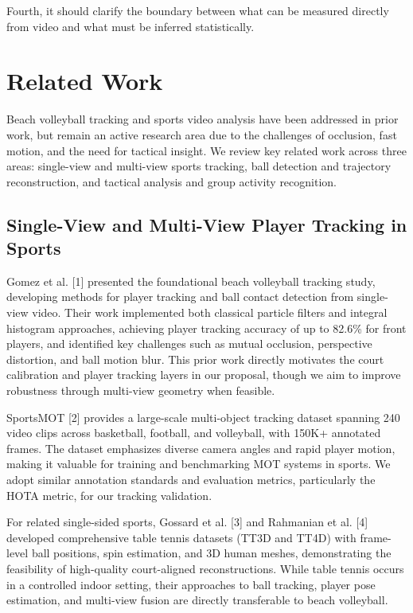 \documentclass[a4paper]{article}
\begin{document}
Fourth, it should clarify the boundary between what can be measured directly from video and what must be inferred statistically.

\section{Related Work}

Beach volleyball tracking and sports video analysis have been addressed in prior work, but remain an active research area due to the challenges of occlusion, fast motion, and the need for tactical insight. We review key related work across three areas: single-view and multi-view sports tracking, ball detection and trajectory reconstruction, and tactical analysis and group activity recognition.

\subsection{Single-View and Multi-View Player Tracking in Sports}

Gomez et al. [1] presented the foundational beach volleyball tracking study, developing methods for player tracking and ball contact detection from single-view video. Their work implemented both classical particle filters and integral histogram approaches, achieving player tracking accuracy of up to 82.6\% for front players, and identified key challenges such as mutual occlusion, perspective distortion, and ball motion blur. This prior work directly motivates the court calibration and player tracking layers in our proposal, though we aim to improve robustness through multi-view geometry when feasible.

SportsMOT [2] provides a large-scale multi-object tracking dataset spanning 240 video clips across basketball, football, and volleyball, with 150K+ annotated frames. The dataset emphasizes diverse camera angles and rapid player motion, making it valuable for training and benchmarking MOT systems in sports. We adopt similar annotation standards and evaluation metrics, particularly the HOTA metric, for our tracking validation.

For related single-sided sports, Gossard et al. [3] and Rahmanian et al. [4] developed comprehensive table tennis datasets (TT3D and TT4D) with frame-level ball positions, spin estimation, and 3D human meshes, demonstrating the feasibility of high-quality court-aligned reconstructions. While table tennis occurs in a controlled indoor setting, their approaches to ball tracking, player pose estimation, and multi-view fusion are directly transferable to beach volleyball.
\end{document}
